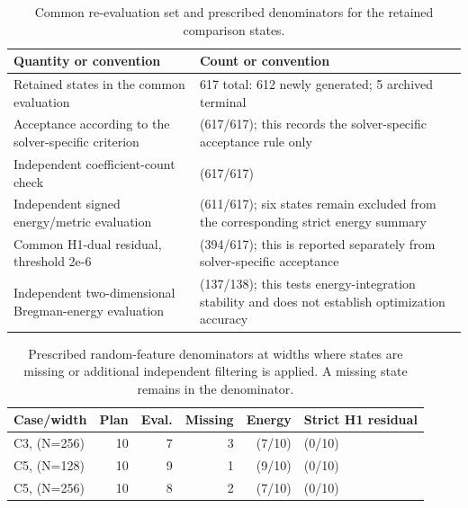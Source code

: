 \begin{table}[!htbp]
\centering
\small
\caption{Common re-evaluation set and prescribed denominators for the retained comparison states.}
\label{tab:unified-audit-boundary}
\begin{tabularx}{\textwidth}{@{}>{\raggedright\arraybackslash}p{}X@{}}
\toprule
Quantity or convention & Count or convention \\
\midrule
Retained states in the common evaluation & 617 total: 612 newly generated; 5 archived terminal \\
Acceptance according to the solver-specific criterion & (617/617); this records the solver-specific acceptance rule only \\
Independent coefficient-count check & (617/617) \\
Independent signed energy/metric evaluation & (611/617); six states remain excluded from the corresponding strict energy summary \\
Common H1-dual residual, threshold 2e-6 & (394/617); this is reported separately from solver-specific acceptance \\
Independent two-dimensional Bregman-energy evaluation & (137/138); this tests energy-integration stability and does not establish optimization accuracy \\
\bottomrule
\end{tabularx}
\end{table}

\begin{table}[!htbp]
\centering
\scriptsize
\caption{Prescribed random-feature denominators at widths where states are missing or additional independent filtering is applied.  A missing state remains in the denominator.}
\label{tab:rfm-fixed-denominators}
\begin{tabularx}{0.98\textwidth}{@{}lrrrr>{\raggedright\arraybackslash}X@{}}
\toprule
Case/width & Plan & Eval. & Missing & Energy & Strict H1 residual \\
\midrule
C3, (N=256) & 10 & 7 & 3 & (7/10) & (0/10) \\
C5, (N=128) & 10 & 9 & 1 & (9/10) & (0/10) \\
C5, (N=256) & 10 & 8 & 2 & (7/10) & (0/10) \\
\bottomrule
\end{tabularx}
\end{table}
